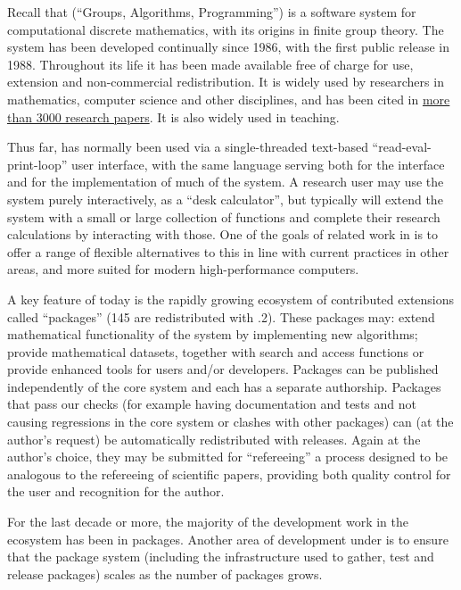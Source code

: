 Recall that \GAP (``Groups, Algorithms, Programming'') is a software system for
computational discrete mathematics, with its origins in finite group
theory. The system has been developed continually since 1986, with the
first public release in 1988. Throughout its life it has been made
available free of charge for use, extension and non-commercial
redistribution. It is widely used by researchers in mathematics,
computer science and other disciplines, and has been cited in
\href{https://www.gap-system.org/Doc/Bib/bib.html}{more than 3000
  research papers}. It is also widely used in teaching.

Thus far, \GAP has
normally been used via a single-threaded text-based ``read-eval-print-loop'' user interface, with the
same \GAP language serving both for the interface and for the
implementation of much of the system. A research user 
may use the system purely interactively, as a ``desk calculator'', but
typically will extend the system with a small or large collection of
\GAP functions and complete their research calculations by interacting
with those. One of the goals of \GAP related work in \ODK is to offer
a range of flexible alternatives to this in line with current
practices in other areas, and more suited for modern high-performance
computers.

A key feature of \GAP today is the rapidly growing ecosystem of
contributed extensions called ``packages'' (145 are redistributed with
.2). These packages may: extend mathematical functionality of
the system by implementing new algorithms; provide mathematical
datasets, together with search and access functions or provide
enhanced tools for users and/or developers. Packages can be published
independently of the core \GAP system and each has a separate
authorship. Packages that pass our checks (for example having
documentation and tests and not causing regressions in the core system
or clashes with other packages) can (at the author's request) be
automatically redistributed with \GAP releases. Again at the author's
choice, they may be
submitted for ``refereeing'' a process designed to be analogous to the
refereeing of scientific papers, providing both quality control for
the user and recognition for the author.

For the last decade or more, the majority of the
development work in the \GAP ecosystem has been in packages.
Another area of \GAP development under \ODK is to ensure
that the package system (including the infrastructure used to gather,
test and release packages) scales as the number of packages grows.



